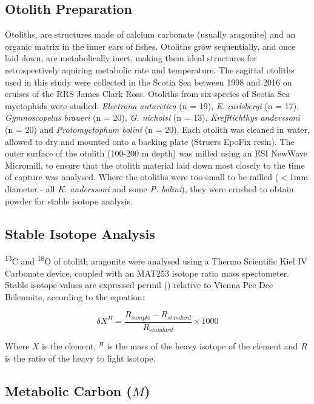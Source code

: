 \documentclass[12pt, titlepage]{article}
\begin{document}
\subsection{Otolith Preparation}

Otoliths, are structures made of calcium carbonate (usually aragonite) and an organic matrix in the inner ears of fishes. 
Otoliths grow sequentially, and once laid down, are metabolically inert, making them ideal structures for retrospectively aquiring metabolic rate and temperature. %
The sagittal otoliths used in this study were collected in the Scotia Sea between 1998 and 2016 on cruises of the RRS James Clark Ross. %
Otoliths from six species of Scotia Sea myctophids were studied: \textit{Electrona antarctica} (n = 19), \textit{E. carlsbergi} (n = 17), \textit{Gymnoscopelus braueri} (n = 20), \textit{G. nicholsi} (n = 13), \textit{Krefftichthys anderssoni} (n = 20) and \textit{Protomyctophum bolini} (n = 20). 
Each otolith was cleaned in water, allowed to dry and mounted onto a backing plate (Struers EpoFix resin).
The outer surface of the otolith (100-200 \textmu m depth) was milled using an ESI NewWave Micromill, to ensure that the otolith material laid down most closely to the time of capture was analysed.
Where the otoliths were too small to be milled ($<$1mm diameter - all \textit{K. anderssoni} and some \textit{P. bolini}), they were crushed to obtain powder for stable isotope analysis.

\subsection{Stable Isotope Analysis}

\textdelta \textsuperscript{13}C and \textdelta \textsuperscript{18}O of otolith aragonite were analysed using a Thermo Scientific Kiel IV Carbonate device, coupled with an MAT253 isotope ratio mass spectometer.
Stable isotope values are expressed permil (\permil) relative to Vienna Pee Dee Belemnite, according to the equation:

\begin{equation}
\delta X^{H} = \frac{R_{sample} - R_{standard}}{R_{standard}} \times 1000
\end{equation}

Where $X$ is the element, $^{H}$ is the mass of the heavy isotope of the element and $R$ is the ratio of the heavy to light isotope. %

\subsection{Metabolic Carbon ($M$)}
\end{document}
